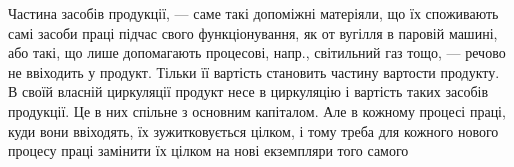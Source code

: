 Частина засобів продукції, — саме такі допоміжні матеріяли, що їх
споживають самі засоби праці підчас свого функціонування, як от вугілля
в паровій машині, або такі, що лише допомагають процесові,
напр., світильний газ тощо, — речово не ввіходить у продукт. Тільки її
вартість становить частину вартости продукту. В своїй власній циркуляції
продукт несе в циркуляцію і вартість таких засобів продукції. Це в
них спільне з основним капіталом. Але в кожному процесі праці, куди
вони ввіходять, їх зужитковується цілком, і тому треба для кожного нового
процесу праці замінити їх цілком на нові екземпляри того самого
\parbreak{}  %
